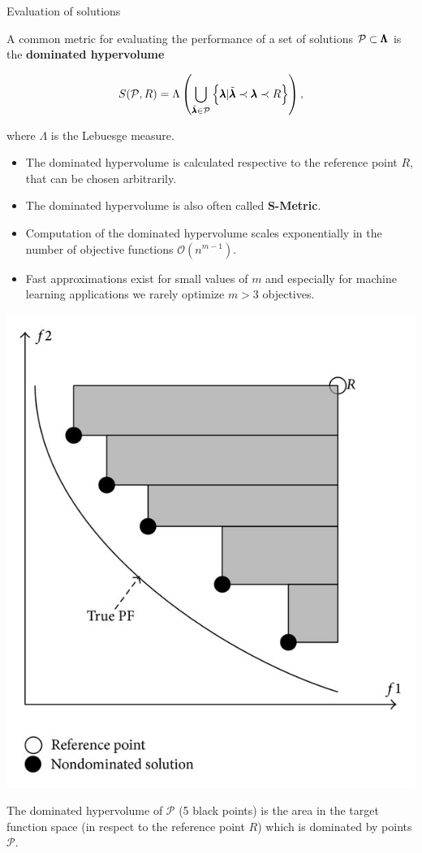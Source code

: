 \begin{frame}[allowframebreaks]{Evaluation of solutions}

A common metric for evaluating the performance of a set of solutions $\mathcal{P} \subset \pmb{\Lambda}$ is the \textbf{dominated hypervolume}

$$
    S(\mathcal{P}, R) = \Lambda\left(\bigcup_{\tilde{\pmb{\lambda}} \in \mathcal{P}}\left\{\pmb{\lambda} | \tilde{\pmb{\lambda}} \prec \pmb{\lambda} \prec R\right\}\right),
$$

where $\Lambda$ is the Lebuesge measure.
    \begin{itemize}
            \item The dominated hypervolume is calculated respective to the reference point $R$, that can be chosen arbitrarily.
            \item The dominated hypervolume is also often called \textbf{S-Metric}.
            \item Computation of the dominated hypervolume scales exponentially in the number of objective functions $\mathcal{O}(n^{m-1})$.
            \item Fast approximations exist for small values of $m$ and especially for machine learning applications we rarely optimize $m > 3$ objectives.
    \end{itemize}

\framebreak

\begin{center}
\includegraphics[width = 0.3\linewidth]{images/dominated_hypervolume.png}
\end{center}

The dominated hypervolume of $\mathcal{P}$ (5 black points) is the area in the target function space (in respect to the reference point $R$) which is dominated by points $\mathcal{P}$.

\end{frame}


